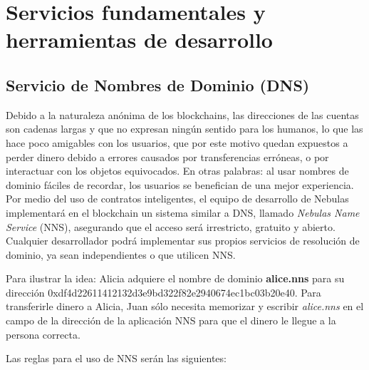 \section{Servicios fundamentales y herramientas de desarrollo}
\label{sec:tools}

\subsection{Servicio de Nombres de Dominio (DNS)}

Debido a la naturaleza anónima de los blockchains, las direcciones de las cuentas son cadenas largas y que no expresan ningún sentido para los humanos, lo que las hace poco amigables con los usuarios, que por este motivo quedan expuestos a perder dinero debido a errores causados por transferencias erróneas, o por interactuar con los objetos equivocados. En otras palabras: al usar nombres de dominio fáciles de recordar, los usuarios se benefician de una mejor experiencia. Por medio del uso de contratos inteligentes, el equipo de desarrollo de Nebulas implementará en el blockchain un sistema similar a DNS, llamado \textit{Nebulas Name Service} (NNS), asegurando que el acceso será irrestricto, gratuito y abierto. Cualquier desarrollador podrá implementar sus propios servicios de resolución de dominio, ya sean independientes o que utilicen NNS.

Para ilustrar la idea: Alicia adquiere el nombre de dominio \textbf{alice.nns} para su dirección 0xdf4d22611412132d3e9bd322f82e2940674ec1bc03b20e40. Para transferirle dinero a Alicia, Juan sólo necesita memorizar y escribir \textit{alice.nns} en el campo de la dirección de la aplicación NNS para que el dinero le llegue a la persona correcta.

Las reglas para el uso de NNS serán las siguientes:

